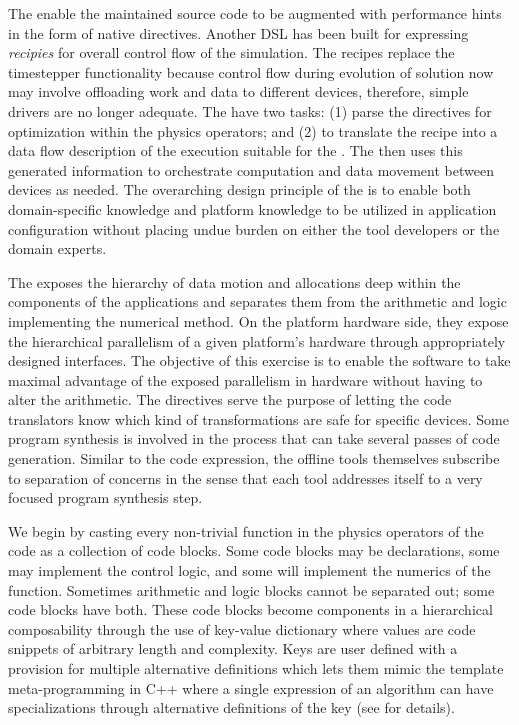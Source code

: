 The \CT enable the maintained source code to be 
augmented with performance hints in the form of \flashx native
directives.  Another DSL has been built for expressing {\it recipies}
for overall control flow of the simulation. The recipes replace the
timestepper functionality because control flow during evolution of
solution now may involve offloading
work and data to different devices, therefore, simple drivers are no
longer adequate. The \CT have two tasks: (1) parse the \flashx
directives for optimization within the physics operators; and (2) to
translate the recipe into a data flow description of the execution
suitable for the \OR.  The {\OR} then uses this generated information
to orchestrate computation and data movement between devices as
needed. The overarching design principle of the {\OS} is to enable
both domain-specific knowledge and platform knowledge to be utilized
in application configuration without placing undue burden on either
the tool developers or the domain experts.

The {\OS} exposes the hierarchy of data motion and allocations
deep within the components of the applications and separates them from
the arithmetic and logic implementing the numerical method. On the
platform hardware side, they expose the hierarchical parallelism of a
given platform's hardware through appropriately designed
interfaces. The objective of this exercise is to enable the software
to take maximal advantage of the exposed parallelism in hardware
without having to alter the arithmetic. The directives serve the
purpose of letting the code translators know which kind of
transformations are safe for specific devices.   Some program
synthesis is involved in the process that can take several passes of
code generation. Similar to the code expression, the offline tools
themselves subscribe to separation of concerns in the sense that each
tool addresses itself to a very focused program synthesis step. 

We begin by casting every non-trivial function in the physics
operators of the code as a collection of code blocks. Some code blocks
may be declarations, some may implement the control logic, and some
will implement the numerics of the function. Sometimes arithmetic and
logic blocks cannot be separated out; some code blocks have
both. These code blocks become components in a hierarchical
composability through the use of key-value dictionary where values are
code snippets of arbitrary length and complexity. Keys are user
defined with a provision for multiple alternative definitions which
lets them mimic the template meta-programming in C++ where a single
expression of an algorithm can have specializations through alternative
definitions of the key (see  for details).

